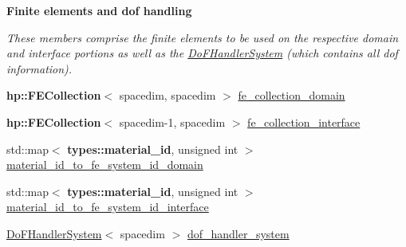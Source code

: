 \begin{Indent}{\bf Finite elements and dof handling}\par
{\em These members comprise the finite elements to be used on the respective domain and interface portions as well as the \hyperlink{class_do_f_handler_system}{Do\+F\+Handler\+System} (which contains all dof information). }\begin{DoxyCompactItemize}
\item 
{\bf hp\+::\+F\+E\+Collection}$<$ spacedim, spacedim $>$ \hyperlink{class_assembly_helper_af3803b0aad9853e6bf018c70be41e791}{fe\+\_\+collection\+\_\+domain}
\item 
{\bf hp\+::\+F\+E\+Collection}$<$ spacedim-\/1, spacedim $>$ \hyperlink{class_assembly_helper_a8b4d224a9ecd2e926a8860829874d2a1}{fe\+\_\+collection\+\_\+interface}
\item 
std\+::map$<$ {\bf types\+::material\+\_\+id}, unsigned int $>$ \hyperlink{class_assembly_helper_a3045f80801fc31920efd161a268aae8e}{material\+\_\+id\+\_\+to\+\_\+fe\+\_\+system\+\_\+id\+\_\+domain}
\item 
std\+::map$<$ {\bf types\+::material\+\_\+id}, unsigned int $>$ \hyperlink{class_assembly_helper_a5fea54137e3c1c5a514e39c9b2ad7926}{material\+\_\+id\+\_\+to\+\_\+fe\+\_\+system\+\_\+id\+\_\+interface}
\item 
\hyperlink{class_do_f_handler_system}{Do\+F\+Handler\+System}$<$ spacedim $>$ \hyperlink{class_assembly_helper_a885e660c749e91a35e3279643ebcd87f}{dof\+\_\+handler\+\_\+system}
\end{DoxyCompactItemize}
\end{Indent}
